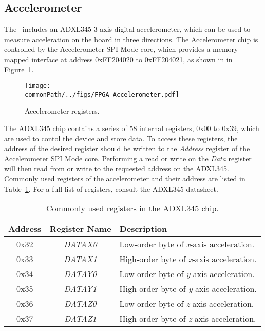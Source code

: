 \subsection {Accelerometer}

The \systemName~includes an ADXL345 3-axis digital accelerometer, which can be used to
measure acceleration on the board in three directions. The Accelerometer chip is controlled by the
Accelerometer SPI Mode core, which provides a memory-mapped interface at address {\sf 0xFF204020}
to {\sf 0xFF204021}, as shown in in Figure~\ref{fig:accel_port}.

\begin{figure}[h!]
   \begin{center}
       \texttt{[image: \\commonPath/../figs/FPGA\_Accelerometer.pdf]}
   \end{center}
   \caption{Accelerometer registers.}
	\label{fig:accel_port}
\end{figure}

The ADXL345 chip contains a series of 58 internal registers, {\sf 0x00} to {\sf 0x39}, which are
used to contol the device and store data. To access these registers, the address of the desired
register should be written to the {\it Address} register of the Accelerometer SPI Mode core.
Performing a read or write on the {\it Data} register will then read from or write to the 
requested address on the ADXL345. Commonly used registers of the accelerometer and their address
are listed in Table~\ref{tab:accel_regs}. For a full list of registers, consult the ADXL345 
datasheet.

\begin{table} [h]%
	\begin {center}
		\begin{tabular}{c|c|l}
			{\bf Address} &
			{\bf Register Name} &
			{\bf Description} \\
			\hline
			{\sf 0x32} & 
			{\it DATAX0} & 
			Low-order byte of {\it x}-axis acceleration. 
			\\
			{\sf 0x33} & 
			{\it DATAX1} & 
			High-order byte of {\it x}-axis acceleration.
			\\
			{\sf 0x34} & 
			{\it DATAY0} & 
			Low-order byte of {\it y}-axis acceleration. 
			\\
			{\sf 0x35} & 
			{\it DATAY1} & 
			High-order byte of {\it y}-axis acceleration.
			\\
			{\sf 0x36} & 
			{\it DATAZ0} & 
			Low-order byte of {\it z}-axis acceleration. 
			\\
			{\sf 0x37} & 
			{\it DATAZ1} & 
			High-order byte of {\it z}-axis acceleration.
			\\
		\end{tabular}
	\end{center}
\caption{Commonly used registers in the ADXL345 chip.}
\label{tab:accel_regs}
\end{table}